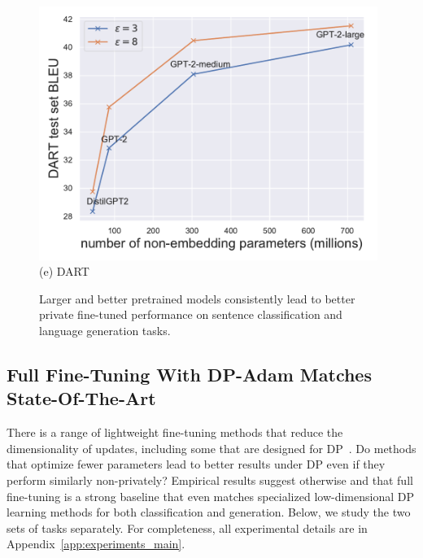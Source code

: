 \begin{figure}[ht]
\begin{center}
\begin{minipage}[t]{0.45\linewidth}
\centering
{\includegraphics[width=0.98\textwidth]{figs/dart_scaling_BLEU.pdf}}
(e) DART
\end{minipage}
\end{center}

\caption{
Larger and better pretrained models consistently lead to better private fine-tuned performance on sentence classification and language generation tasks.
}
\label{fig:fig1_extension}
\end{figure}

\subsection[Full Fine-Tuning With DP-Adam Matches State-Of-The-Art]{\normalsize Full Fine-Tuning With DP-Adam Matches State-Of-The-Art}\label{sec:experiments_main}
There is a range of lightweight fine-tuning methods that reduce the dimensionality of updates, including some that are designed for DP~\citep{yu2021large}.
Do methods that optimize fewer parameters lead to better results under DP even if they perform similarly non-privately? Empirical results suggest otherwise and that full fine-tuning is a strong baseline that even matches specialized low-dimensional DP learning methods for both classification and generation.
Below, we study the two sets of tasks separately. 
For completeness, all experimental details are in Appendix~\ref{app:experiments_main}.

